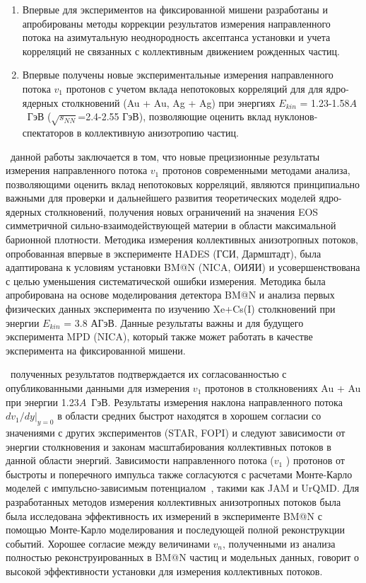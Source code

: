\novelty
\begin{enumerate}
    \item Впервые для экспериментов на фиксированной мишени разработаны и апробированы методы коррекции результатов измерения направленного потока на азимутальную неоднородность аксептанса установки и учета корреляций не связанных с  коллективным движением рожденных частиц.

    \item Впервые получены новые экспериментальные измерения направленного потока $v_1$ протонов с учетом вклада непотоковых корреляций для для ядро-ядерных столкновений (Au + Au, Ag + Ag) при энергиях $E_{kin}$ = 1.23-1.58$A$~ГэВ ($\sqrt{s_{NN}}$=2.4-2.55 ГэВ), позволяющие оценить вклад нуклонов-спектаторов в коллективную анизотропию частиц.
\end{enumerate}
\influence\ данной работы заключается в том, что новые прецизионные результаты измерения направленного потока $v_1$ протонов современными методами анализа, позволяющими оценить вклад непотоковых корреляций, являются принципиально важными для проверки и дальнейшего развития теоретических моделей ядро-ядерных столкновений, получения новых ограничений на значения EOS симметричной сильно-взаимодействующей материи в области максимальной барионной плотности.
Методика измерения коллективных анизотропных потоков, опробованная впервые в эксперименте HADES (ГСИ, Дармштадт), была адаптирована к условиям установки BM@N (NICA, ОИЯИ) и усовершенствована с целью уменьшения систематической ошибки измерения. Методика была апробирована на основе моделирования детектора BM@N и анализа первых физических данных эксперимента по изучению Xe+Cs(I) столкновений при энергии $E_{kin}$ = 3.8 АГэВ.  
Данные результаты важны и  для будущего эксперимента MPD (NICA), который также может работать в качестве эксперимента на фиксированной мишени.

\reliability\ полученных результатов подтверждается их согласованностью с опубликованными данными для измерения  $v_1$ протонов в столкновениях Au + Au при энергии 1.23$A$~ГэВ. 
Результаты измерения наклона направленного потока $dv_1/dy|_{y=0}$ в области средних быстрот находятся в хорошем согласии со значениями с других экспериментов (STAR, FOPI)  и следуют зависимости от энергии столкновения и законам масштабирования коллективных потоков в данной области энергий.
Зависимости направленного потока ($v_1$ ) протонов от быстроты и поперечного импульса также согласуются с расчетами Монте-Карло моделей с импульсно-зависимым потенциалом~\cite{nara2019jam}, такими как JAM и UrQMD.
Для разработанных методов измерения коллективных анизотропных потоков была была исследована эффективность их измерений в эксперименте BM@N с помощью Монте-Карло моделирования и последующей полной реконструкции событий.
Хорошее согласие между величинами  $v_n$,  полученными из анализа полностью реконструированных в BM@N частиц  и модельных данных, говорит о высокой эффективности установки для измерения коллективных потоков.\\

